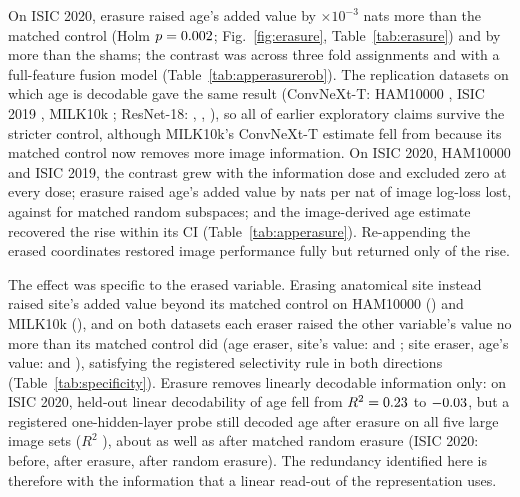 \documentclass[conference]{IEEEtran}
\begin{document}
On ISIC 2020, erasure raised age's added value by \ERAIsic{}$\times10^{-3}$ nats more than the matched control (Holm $p=0.002$; Fig.~\ref{fig:erasure}, Table~\ref{tab:erasure}) and by \ERAIsicSham{} more than the shams; the contrast was \ERAisicFolds{} across three fold assignments and \ERAisicFull{} with a full-feature fusion model (Table~\ref{tab:apperasurerob}). The replication datasets on which age is decodable gave the same result (ConvNeXt-T: HAM10000 \ERAHam{}, ISIC 2019 \ERAIsicNt{}, MILK10k \ERAMilk{}; ResNet-18: \ERArnHam{}, \ERArnIsicNt{}, \ERArnMilk{}), so all \ERAcontHeld{} of \ERAcontN{} earlier exploratory claims survive the stricter control, although MILK10k's ConvNeXt-T estimate fell from \ERAmilkOld{} because its matched control now removes more image information. On ISIC 2020, HAM10000 and ISIC 2019, the contrast grew with the information dose and excluded zero at every dose; erasure raised age's added value by \ERArfT{} nats per nat of image log-loss lost, against \ERArfR{} for matched random subspaces; and the image-derived age estimate recovered the rise within its CI (Table~\ref{tab:apperasure}). Re-appending the erased coordinates restored image performance fully but returned only \ERAreapp{} of the rise.

The effect was specific to the erased variable. Erasing anatomical site instead raised site's added value beyond its matched control on HAM10000 (\SITEHam{}) and MILK10k (\SITEMilk{}), and on both datasets each eraser raised the other variable's value no more than its matched control did (age eraser, site's value: \SPECHamAgeSite{} and \SPECMilkAgeSite{}; site eraser, age's value: \SPECHamSiteAge{} and \SPECMilkSiteAge{}), satisfying the registered selectivity rule in both directions (Table~\ref{tab:specificity}). Erasure removes linearly decodable information only: on ISIC 2020, held-out linear decodability of age fell from $R^2=0.23$ to $-0.03$, but a registered one-hidden-layer probe still decoded age after erasure on all five large image sets ($R^2$ \ERAmlp{}), about as well as after matched random erasure (ISIC 2020: \ERAmlpIsicZero{} before, \ERAmlpIsicOne{} after erasure, \ERAmlpIsicRand{} after random erasure). The redundancy identified here is therefore with the information that a linear read-out of the representation uses.
\end{document}

